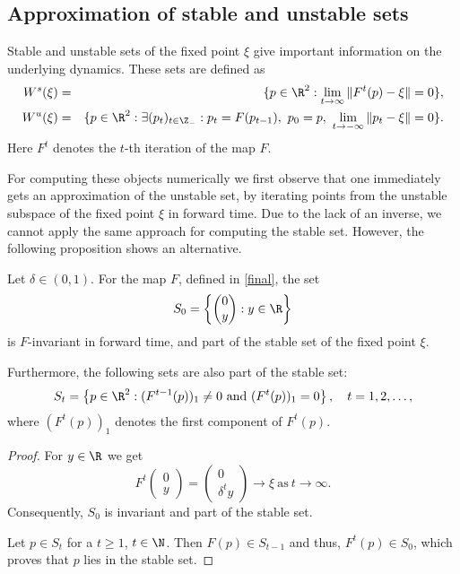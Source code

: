 \subsection{Approximation of stable and unstable sets}
Stable and unstable sets of the fixed point $\xi$ give important
information on the underlying dynamics. These sets are defined as 
\begin{eqnarray*}
W^s(\xi) &=& \{ p \in \R^2: \lim_{t \to \infty}\|F^t(p) - \xi\| = 0\},\\
W^u(\xi) &=& \{ p \in \R^2: \exists (p_t)_{t\in\Z_-}: p_{t} =
F(p_{t-1}),\ p_0 = p,\ \lim_{t \to -\infty}\|p_t - \xi\| = 0\}.   
\end{eqnarray*}
Here $F^t$ denotes the $t$-th iteration of the map $F$.

For computing these objects numerically we first observe that one
immediately gets an approximation of the unstable set, by iterating
points from 
the unstable subspace of the fixed point $\xi$ in forward time. Due to
the lack of an inverse, we cannot apply the same approach for
computing the stable set. However, the following proposition shows an
alternative. 

\begin{proposition}\label{prop1}
Let $\delta \in (0,1)$.
For the map $F$, defined in \eqref{final}, the set
$$
S_0 = \left\{
  \begin{pmatrix}
   0\\y 
  \end{pmatrix}
  : y \in \R \right\}
$$
is $F$-invariant in forward time,
and part of the stable set of the fixed point $\xi$.

Furthermore, the following sets are also part of the stable set:
$$
S_t = \left\{p \in \R^2: (F^{t-1}(p))_1 \neq 0 \text{ and } (F^t(p))_1
  = 0\right\},\quad t = 1,2,\dots, 
$$
where $(F^t(p))_1$ denotes the first component of $F^t(p)$.
\end{proposition}

\begin{proof}
For $y \in \R$ we get
$$
F^t
\begin{pmatrix}
0\\y  
\end{pmatrix}
= 
\begin{pmatrix}
0\\\delta^t y  
\end{pmatrix}
\to \xi \ \text{as}\ t \to \infty. 
$$
Consequently, $S_0$ is invariant and part of the stable set.

Let $p\in S_t$ for a $t \ge 1$, $t\in \N$. Then $F(p)\in S_{t-1}$
and thus, $F^{t}(p) \in S_0$, which proves that $p$ lies in the stable
set.
 
\end{proof}

